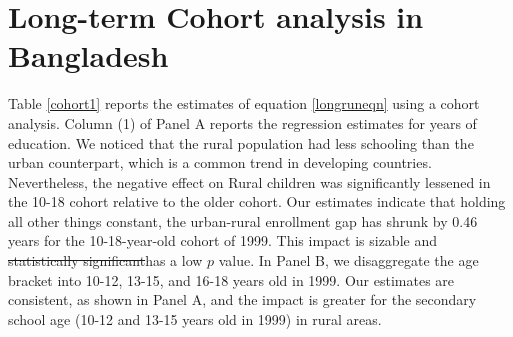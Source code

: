 \documentclass[12pt,letterpaper]{article}
\newcommand{\0}{\ensuremath{\mbox{\boldmath $0$}}}
\begin{document}
\section{Long-term Cohort analysis in Bangladesh\label{sec.long-term}}


Table \ref{cohort1} reports the estimates of equation \ref{longruneqn} using a cohort analysis. Column (1) of Panel A reports the regression estimates for years of education. We noticed that the rural population had less schooling than the urban counterpart, which is a common trend in developing countries. Nevertheless, the negative effect on Rural children was significantly lessened in the 10-18 cohort relative to the older cohort. Our estimates indicate that holding all other things constant, the urban-rural enrollment gap has shrunk by 0.46 years for the 10-18-year-old cohort of 1999. This impact is sizable and \sout{statistically significant}has a low $p$ value. In Panel B, we disaggregate the age bracket into 10-12, 13-15, and 16-18 years old in 1999. Our estimates are consistent, as shown in Panel A, and the impact is greater for the secondary school age (10-12 and 13-15 years old in 1999) in rural areas. 
\end{document}
